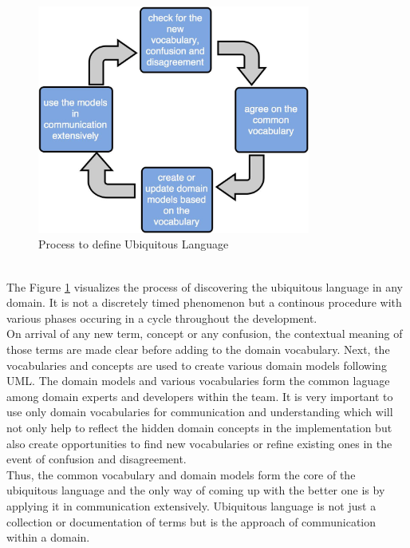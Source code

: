 \begin{figure}[H]
\begin{center}
\includegraphics[width=0.8\textwidth]{figures/domain-driven-design-one}
\caption{Process to define Ubiquitous Language \cite{Evans:2003aa}}
\label{fig:domain_driven_design/ubiquitous_language_process}
\end{center}
\end{figure}
\\
The Figure \ref{fig:domain_driven_design/ubiquitous_language_process} visualizes the process of discovering the ubiquitous language in any domain. It is not a discretely timed phenomenon but a continous procedure with various phases occuring in a cycle throughout the development.
\\
On arrival of any new term, concept or any confusion, the contextual meaning of those terms are made clear before adding to the domain vocabulary. Next, the vocabularies and concepts are used to create various domain models following \acrshort{UML}. The domain models and various vocabularies form the common laguage among domain experts and developers within the team. It is very important to use only domain vocabularies for communication and understanding which will not only help to reflect the hidden domain concepts in the implementation but also create opportunities to find new vocabularies or refine existing ones in the event of confusion and disagreement.\cite{Evans:2003aa}
\\
Thus, the common vocabulary and domain models form the core of the ubiquitous language and the only way of coming up with the better one is by applying it in communication extensively. Ubiquitous language is not just a collection or documentation of terms but is the approach of communication within a domain.
\\
